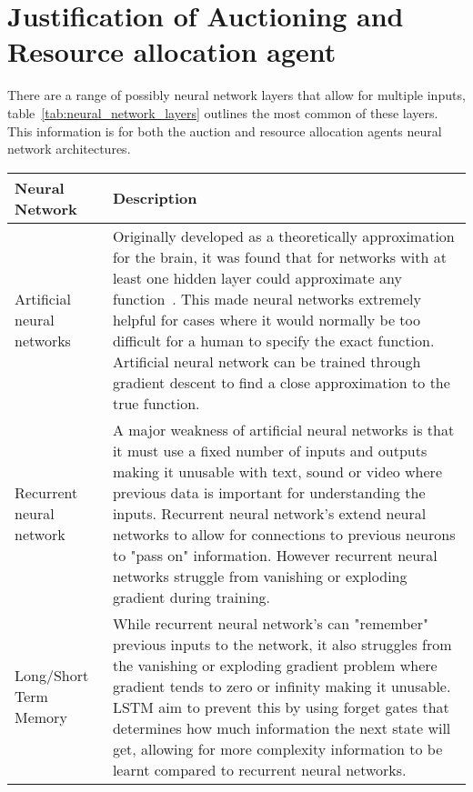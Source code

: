 
\section{Justification of Auctioning and Resource allocation agent}\label{sec:justification-of-auctioning-and-resource-allocation-agent}
There are a range of possibly neural network layers that allow for multiple inputs,
table~\ref{tab:neural_network_layers} outlines the most common of these layers. This information is for both the
auction and resource allocation agents neural network architectures.

\begin{longtable}{|p{3.5cm}|p{11cm}|} \hline
    \textbf{Neural Network} & \textbf{Description} \\ \hline
    Artificial neural networks~\citep{ANN} & Originally developed as a theoretically approximation for the brain, it
        was found that for networks with at least one hidden layer could approximate any
        function~\citep{csaji2001approximation}. This made neural networks extremely helpful for cases where it would
        normally be too difficult for a human to specify the exact function. Artificial neural network can be trained
        through gradient descent to find a close approximation to the true function. \\ \hline

    Recurrent neural network~\citep{RNN} & A major weakness of artificial neural networks is that it must use a fixed
        number of inputs and outputs making it unusable with text, sound or video where previous data is important
        for understanding the inputs. Recurrent neural network's extend neural networks to allow for connections to
        previous neurons to "pass on" information. However recurrent neural networks struggle from vanishing or
        exploding gradient during training. \\ \hline

    Long/Short Term Memory~\citep{LSTM} & While recurrent neural network's can "remember" previous inputs to the
        network, it also struggles from the vanishing or exploding gradient problem where gradient tends to zero or
        infinity making it unusable. LSTM aim to prevent this by using forget gates that determines how much
        information the next state will get, allowing for more complexity information to be learnt compared to
        recurrent neural networks. \\ \hline


\end{longtable}
